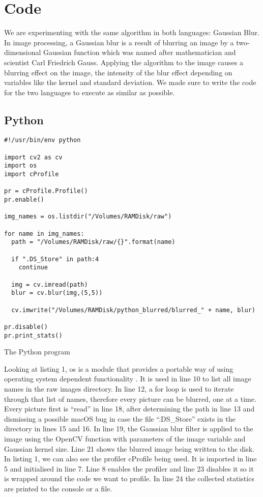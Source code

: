 \section{Code}
We are experimenting with the same algorithm in both languages: Gaussian Blur. In image processing, a Gaussian blur is a result of blurring an image by a two-dimensional Gaussian function which was named after mathematician and scientist Carl Friedrich Gauss. Applying the algorithm to the image causes a blurring effect on the image, the intensity of the blur effect depending on variables like the kernel and standard deviation. We made sure to write the code for the two languages to execute as similar as possible.

\subsection{Python}


\begin{listing}[!ht]
\begin{verbatim}
#!/usr/bin/env python

import cv2 as cv
import os
import cProfile

pr = cProfile.Profile()
pr.enable()

img_names = os.listdir("/Volumes/RAMDisk/raw")

for name in img_names:
  path = "/Volumes/RAMDisk/raw/{}".format(name)

  if ".DS_Store" in path:4
    continue

  img = cv.imread(path)
  blur = cv.blur(img,(5,5))

  cv.imwrite("/Volumes/RAMDisk/python_blurred/blurred_" + name, blur)

pr.disable()
pr.print_stats()
\end{verbatim}
\caption{The Python program}
\label{listing:python}
\end{listing}

Looking at listing 1, os is a module that provides a portable way of using operating system dependent functionality \cite{os}. It is used in line 10 to list all image names in the raw images directory. In line 12, a for loop is used to iterate through that list of names, therefore every picture can be blurred, one at a time. Every picture first is “read” in line 18, after determining the path in line 13 and dismissing a possible macOS bug in case the file “.DS\_Store” exists in the directory in lines 15 and 16. In line 19, the Gaussian blur filter is applied to the image using the OpenCV function with parameters of the image variable and Gaussian kernel size. Line 21 shows the blurred image being written to the disk.
In listing 1, we can also see the profiler cProfile being used. It is imported in line 5 and initialised in line 7. Line 8 enables the profiler and line 23 disables it so it is wrapped around the code we want to profile. In line 24 the collected statistics are printed to the console or a file.

